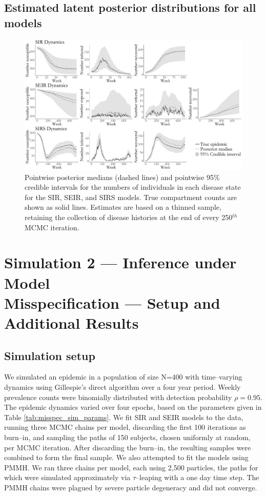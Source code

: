 \subsection{Estimated latent posterior distributions for all models}
\begin{figure}[htbp]
	\centering
	\includegraphics[width=\linewidth]{figures/sim1_latent_posts_all.pdf}
	\caption[Simulation 1 latent posterior distributions for all models.]{Pointwise posterior medians (dashed lines) and pointwise 95\% credible intervals for the numbers of individuals in each disease state for the SIR, SEIR, and SIRS models. True compartment counts are shown as solid lines. Estimates are based on a thinned sample, retaining the collection of disease histories at the end of every 250$ ^{th} $ MCMC iteration.}
	\label{fig:sim1_latent_post_all}
\end{figure}


\section{Simulation 2 --- Inference under Model\\ Misspecification --- Setup and Additional Results}
\label{sec:bda_misspec_sim_details}
\subsection{Simulation setup}
We simulated an epidemic in a population of size N=400 with time--varying dynamics using Gillespie's direct algorithm over a four year period. Weekly prevalence counts were binomially distributed with detection probability $ \rho = 0.95 $. The epidemic dynamics varied over four epochs, based on the parameters given in Table \ref{tab:misspec_sim_params}. We fit SIR and SEIR models to the data, running three MCMC chains per model, discarding the first 100 iterations as burn--in, and sampling the paths of 150 subjects, chosen uniformly at random, per MCMC iteration. After discarding the burn--in, the resulting samples were combined to form the final sample. We also attempted to fit the models using PMMH. We ran three chains per model, each using 2,500 particles, the paths for which were simulated approximately via $ \tau$--leaping with a one day time step. The PMMH chains were plagued by severe particle degeneracy and did not converge.

